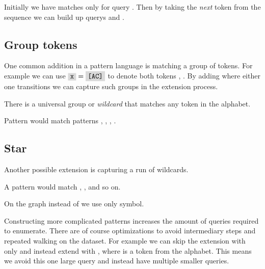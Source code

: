 Initially we have matches only for query . Then by taking the \emph{next} token from the sequence we can build up querys  and .

\subsection{Group tokens}

One common addition in a pattern language is matching a group of tokens. For example we can use $\R{x} = \R{[AC]}$ to denote both tokens , . By adding where either one transitions we can capture such groups in the extension process.

\begin{figure}[H]
	
\end{figure}

There is a universal group  or \emph{wildcard} that matches any token in the alphabet.

\begin{exmp}
Pattern  would match patterns , , , .
\end{exmp}

\subsection{Star}

Another possible extension is capturing a run of wildcards.

\begin{exmp}
A pattern  would match , ,  and so on.
\end{exmp}

On the graph instead of  we use only \R{*} symbol.

\begin{figure}[H]
	
\end{figure}

Constructing more complicated patterns increases the amount of queries required to enumerate. There are of course optimizations to avoid intermediary steps and repeated walking on the dataset. For example we can skip the extension with only  and instead extend with , where  is a token from the alphabet. This means we avoid this one large query and instead have multiple smaller queries.

\begin{figure}[H]
	
\end{figure}


